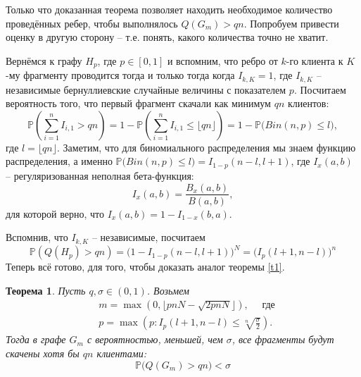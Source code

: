 \documentclass{matmex-diploma-custom}
\newcommand{\PRob}{\mathbb P}
\newcommand{\leqs}{\leqslant}
\newtheorem{theorem}{Теорема}
\theoremstyle{named}
\begin{document}
\bigskip

Только что доказанная теорема позволяет находить необходимое количество проведённых ребер, чтобы выполнялось $Q(G_m) > qn$.
Попробуем привести оценку в другую сторону -- т.е. понять, какого количества точно не хватит.

Вернёмся к графу $H_p$, где $p \in [0,1]$ и вспомним, что ребро от $k$-го клиента к $K$-му фрагменту проводится тогда и только тогда
когда $I_{k,K} = 1$, где $I_{k,K}$ -- независимые бернуллиевские случайные величины с показателем $p$. 
Посчитаем вероятность того, что первый фрагмент скачали как минимум $qn$ клиентов:
\begin{equation}
\PRob\left(\sum_{i=1}^n I_{i,1} > qn\right) 
	= 
1 - \PRob\left(\sum_{i=1}^n I_{i,1} \leqs \lfloor qn \rfloor\right) 
	= 
1 - \PRob\big(Bin(n, p) \leqs l\big),
\end{equation}
где $l = \lfloor qn \rfloor$. Заметим, что для биномиального распределения мы знаем функцию распределения, 
а именно $\PRob\big(Bin(n, p) \leqs l\big) = I_{1-p}(n-l, l+1)$, где $I_x(a,b)$ -- регуляризованная неполная бета-функция:
\begin{equation}
I_x(a,b) = \frac{B_x(a,b)}{B(a,b)},
\end{equation}
для которой верно, что $I_x(a,b) = 1 - I_{1-x}(b, a)$.

Вспомнив, что $I_{k,K}$ -- независимые, посчитаем
\begin{equation}\label{n21}
\PRob(Q(H_p) > qn) = \big(1 - I_{1-p}(n-l, l+1)\big)^N = \big(I_{p}(l+1, n-l)\big)^n
\end{equation}
Теперь всё готово, для того, чтобы доказать аналог теоремы \ref{t1}.

\begin{theorem}\label{t2}
Пусть $q, \sigma \in (0, 1)$. Возьмем 
\begin{align}
& m = \max(0, \lfloor pnN - \sqrt{2pnN} \rfloor), \quad \text{ где} \\
& p = \max\left(p :  I_p(l+1, n-l) \leqs \sqrt[n]{\frac\sigma{2}} \right).
\end{align}
Тогда в графе $G_m$ с вероятностью, меньшей, чем $\sigma$, все фрагменты будут скачены хотя бы $qn$ клиентами:
\begin{equation}
\PRob\big(Q(G_m) > qn\big) < \sigma
\end{equation}
\end{theorem}
\end{document}
